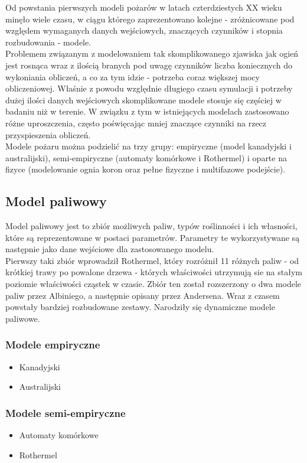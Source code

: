 \documentclass[a4paper, 11pt]{article}
\begin{document}
	Od powstania pierwszych modeli pożarów w latach czterdziestych XX wieku minęło wiele czasu, w ciągu którego zaprezentowano kolejne - zróżnicowane pod względem wymaganych danych wejściowych, znaczących czynników i stopnia rozbudowania - modele.\\
	\indent	Problemem związanym z modelowaniem tak skomplikowanego zjawiska jak ogień jest rosnąca wraz z ilością branych pod uwagę czynników liczba koniecznych do wykoniania obliczeń, a co za tym idzie - potrzeba coraz większej mocy obliczeniowej. Właśnie  z powodu względnie długiego czasu symulacji i potrzeby dużej ilości danych wejściowych skomplikowane modele stosuje się częściej w badaniu niż w terenie.  W związku z tym w istniejących modelach zastosowano różne uproszczenia, często poświęcając mniej znaczące czynniki na rzecz przyspieszenia obliczeń.  \\
	\indent	Modele pożaru można podzielić na trzy grupy: empiryczne (model kanadyjski i australijski), semi-empiryczne (automaty komórkowe i Rothermel) i oparte na fizyce (modelowanie ognia koron oraz pełne fizyczne i multifazowe podejście).
		\subsection{Model paliwowy}	
		\indent
		
		Model paliwowy jest to zbiór możliwych paliw, typów roślinności i ich własności, które są reprezentowane w postaci parametrów. Parametry te wykorzystywane są następnie jako dane wejściowe dla zastosowanego modelu.\\
		
		 Pierwszy taki zbiór wprowadził Rothermel, który rozróżnił 11 różnych paliw - od  krótkiej trawy po powalone drzewa - których właściwości utrzymują sie na stałym poziomie właściwości cząstek w czasie. Zbiór ten został rozszerzony o dwa modele paliw przez Albiniego, a następnie opisany przez Andersena. Wraz z czasem powstały bardziej rozbudowane zestawy. Narodziły się dynamiczne modele paliwowe. 
	
	\iffalse
	\subsubsection*{Modele empiryczne}
	\begin{itemize}
		\item Kanadyjski
		\item Australijski
	\end{itemize}
	\subsubsection*{Modele semi-empiryczne}
	\begin{itemize}
		\item Automaty komórkowe
		\item Rothermel
	\end{itemize}
\end{document}
